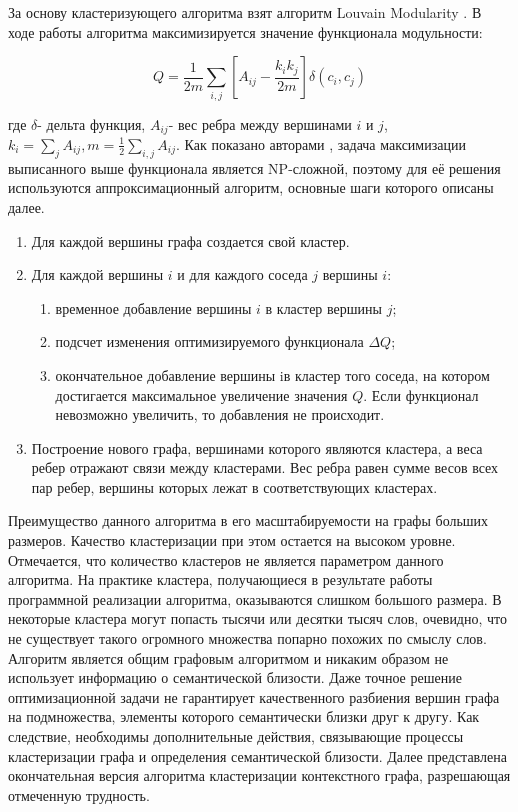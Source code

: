 За основу кластеризующего алгоритма взят алгоритм Louvain Modularity \cite{louvain_modularity}. В ходе работы алгоритма максимизируется значение функционала модульности: 

$$ Q = \frac{1}{2m}\sum_{i,j}[A_{ij} - \frac{k_i k_j}{2m}]\delta(c_i, c_j) $$

где $\delta$- дельта функция, $A_{ij}$- вес ребра между вершинами $i$ и $j$, $k_i=\sum_j{A_{ij}}, m=\frac{1}{2}\sum_{i,j}A_{ij}$. Как показано авторами \cite{modularity_is_hard}, задача максимизации выписанного выше функционала является NP-сложной, поэтому для её  решения используются аппроксимационный алгоритм, основные шаги которого описаны далее.

\begin{enumerate}
\item Для каждой вершины графа создается свой кластер.
\item Для каждой вершины $i$ и для каждого соседа $j$ вершины $i$:
    \begin{enumerate}
        \item временное добавление вершины $i$ в кластер вершины $j$;
        \item подсчет изменения оптимизируемого функционала $\Delta Q$;
        \item окончательное добавление вершины iв кластер того соседа, на котором достигается максимальное увеличение значения $Q$. Если функционал невозможно увеличить, то добавления не происходит.
    \end{enumerate}
\item Построение нового графа, вершинами которого являются кластера, а веса ребер отражают связи между кластерами. Вес ребра равен сумме весов всех пар ребер, вершины которых лежат в соответствующих кластерах.
\end{enumerate}

Преимущество данного алгоритма в его масштабируемости на графы больших размеров. Качество кластеризации при этом остается на высоком уровне. Отмечается, что количество кластеров не является параметром данного алгоритма. На практике кластера, получающиеся в результате работы программной реализации алгоритма, оказываются слишком большого размера. В некоторые кластера могут попасть тысячи или десятки тысяч слов, очевидно, что не существует такого огромного множества попарно похожих по смыслу слов. Алгоритм является общим графовым алгоритмом и никаким образом не использует информацию о семантической близости. Даже точное решение оптимизационной задачи не гарантирует качественного разбиения вершин графа на подмножества, элементы которого семантически близки друг к другу. Как следствие, необходимы дополнительные действия, связывающие процессы кластеризации графа и определения семантической близости. Далее представлена окончательная версия алгоритма кластеризации контекстного графа, разрешающая отмеченную трудность.

